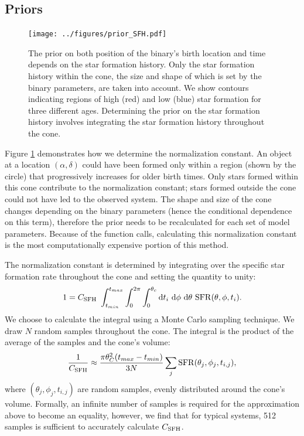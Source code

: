 \documentclass[12pt, preprint]{aastex}
\newcommand{\dd}{\mathrm{d}}
\begin{document}
\subsection{Priors} \label{sec:priors_indiv}


\begin{figure}[h!]
\begin{center}
\texttt{[image: ../figures/prior\_SFH.pdf]}
\caption{The prior on both position of the binary's birth location and time depends on the star formation history. Only the star formation history within the cone, the size and shape of which is set by the binary parameters, are taken into account. We show contours indicating regions of high (red) and low (blue) star formation for three different ages. Determining the prior on the star formation history involves integrating the star formation history throughout the cone.}
\label{fig:prior_SFH}
\end{center}
\end{figure}

Figure \ref{fig:prior_SFH} demonstrates how we determine the normalization constant. An object at a location $(\alpha, \delta)$ could have been formed only within a region (shown by the circle) that progressively increases for older birth times. Only stars formed within this cone contribute to the normalization constant; stars formed outside the cone could not have led to the observed system. The shape and size of the cone changes depending on the binary parameters (hence the conditional dependence on this term), therefore the prior needs to be recalculated for each set of model parameters. Because of the function calls, calculating this normalization constant is the most computationally expensive portion of this method. 

The normalization constant is determined by integrating over the specific star formation rate throughout the cone and setting the quantity to unity:
\begin{equation}
1 = C_{\rm SFH}\ \int_{t_{min}}^{t_{max}} \int_0^{2 \pi} \int_0^{\theta_c} \dd t_i\ \dd \phi\ \dd \theta\ {\rm SFR}(\theta, \phi, t_i). 
\end{equation}
We choose to calculate the integral using a Monte Carlo sampling technique. We draw $N$ random samples throughout the cone. The integral is the product of the average of the samples and the cone's volume:
\begin{equation}
\frac{1}{C_{\rm SFH}} \approx \frac{\pi \theta_C^2 (t_{max} - t_{min})}{3N} \sum_j {\rm SFR}(\theta_j, \phi_j, t_{i,j}),
\end{equation}
where $(\theta_j, \phi_j, t_{i,j})$ are random samples, evenly distributed around the cone's volume. Formally, an infinite number of samples is required for the approximation above to become an equality, however, we find that for typical systems, 512 samples is sufficient to accurately calculate $C_{\rm SFH}$.
\end{document}
